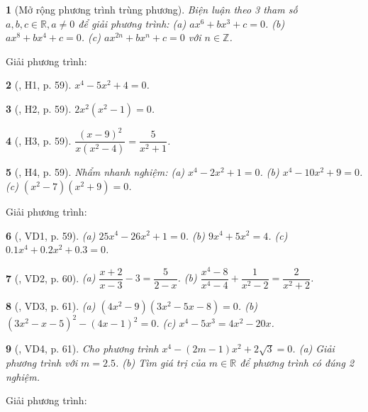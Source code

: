 \documentclass{article}
\newtheorem{baitoan}{}
\begin{document}
\begin{baitoan}[Mở rộng phương trình trùng phương]
	Biện luận theo 3 tham số $a,b,c\in\mathbb{R},a\ne0$ để giải phương trình: (a) $ax^6 + bx^3 + c = 0$. (b) $ax^8 + bx^4 + c = 0$. (c) $ax^{2n} + bx^n + c = 0$ với $n\in\mathbb{Z}$.
\end{baitoan}
Giải phương trình:

\begin{baitoan}[\cite{Binh_boi_duong_Toan_9_tap_2}, H1, p. 59]
	$x^4 - 5x^2 + 4 = 0$.
\end{baitoan}

\begin{baitoan}[\cite{Binh_boi_duong_Toan_9_tap_2}, H2, p. 59]
	$2x^2(x^2 - 1) = 0$.
\end{baitoan}

\begin{baitoan}[\cite{Binh_boi_duong_Toan_9_tap_2}, H3, p. 59]
	$\dfrac{(x - 9)^2}{x(x^2 - 4)} = \dfrac{5}{x^2 + 1}$.
\end{baitoan}

\begin{baitoan}[\cite{Binh_boi_duong_Toan_9_tap_2}, H4, p. 59]
	Nhẩm nhanh nghiệm: (a) $x^4 - 2x^2 + 1 = 0$. (b) $x^4 - 10x^2 + 9 = 0$. (c) $(x^2 - 7)(x^2 + 9) = 0$.
\end{baitoan}
Giải phương trình:

\begin{baitoan}[\cite{Binh_boi_duong_Toan_9_tap_2}, VD1, p. 59]
	(a) $25x^4 - 26x^2 + 1 = 0$. (b) $9x^4 + 5x^2 = 4$. (c) $0.1x^4 + 0.2x^2 + 0.3 = 0$.
\end{baitoan}

\begin{baitoan}[\cite{Binh_boi_duong_Toan_9_tap_2}, VD2, p. 60]
	(a) $\dfrac{x + 2}{x - 3} - 3 = \dfrac{5}{2 - x}$. (b) $\dfrac{x^4 - 8}{x^4 - 4} + \dfrac{1}{x^2 - 2} = \dfrac{2}{x^2 + 2}$.
\end{baitoan}

\begin{baitoan}[\cite{Binh_boi_duong_Toan_9_tap_2}, VD3, p. 61]
	(a) $(4x^2 - 9)(3x^2 - 5x - 8) = 0$. (b) $(3x^2 - x - 5)^2 - (4x - 1)^2 = 0$. (c) $x^4 - 5x^3 = 4x^2 - 20x$.
\end{baitoan}

\begin{baitoan}[\cite{Binh_boi_duong_Toan_9_tap_2}, VD4, p. 61]
	Cho phương trình $x^4 - (2m - 1)x^2 + 2\sqrt{3} = 0$. (a) Giải phương trình với $m = 2.5$. (b) Tìm giá trị của $m\in\mathbb{R}$ để phương trình có đúng 2 nghiệm.
\end{baitoan}
Giải phương trình:
\end{document}
